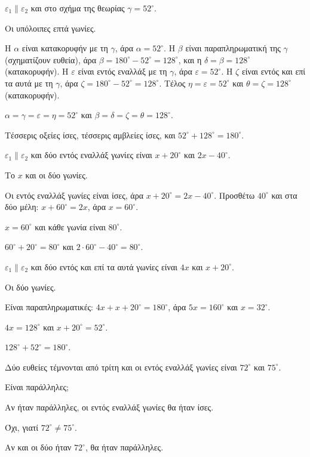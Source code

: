 \tixero $\varepsilon_1\parallel\varepsilon_2$ και στο σχήμα της θεωρίας $\gamma=52^\circ$.\par
\tithelo Οι υπόλοιπες επτά γωνίες.\par
\possindeo Η $\alpha$ είναι κατακορυφήν με τη $\gamma$, άρα $\alpha=52^\circ$. Η $\beta$ είναι παραπληρωματική της $\gamma$ (σχηματίζουν ευθεία), άρα $\beta=180^\circ-52^\circ=128^\circ$, και η $\delta=\beta=128^\circ$ (κατακορυφήν). Η $\varepsilon$ είναι εντός εναλλάξ με τη $\gamma$, άρα $\varepsilon=52^\circ$. Η $\zeta$ είναι εντός και επί τα αυτά με τη $\gamma$, άρα $\zeta=180^\circ-52^\circ=128^\circ$. Τέλος $\eta=\varepsilon=52^\circ$ και $\theta=\zeta=128^\circ$ (κατακορυφήν).\par
\apantisi $\alpha=\gamma=\varepsilon=\eta=52^\circ$ και $\beta=\delta=\zeta=\theta=128^\circ$.\par
\elegxos Τέσσερις οξείες ίσες, τέσσερις αμβλείες ίσες, και $52^\circ+128^\circ=180^\circ$.

\tixero $\varepsilon_1\parallel\varepsilon_2$ και δύο εντός εναλλάξ γωνίες είναι $x+20^\circ$ και $2x-40^\circ$.\par
\tithelo Το $x$ και οι δύο γωνίες.\par
\possindeo Οι εντός εναλλάξ γωνίες είναι ίσες, άρα $x+20^\circ=2x-40^\circ$. Προσθέτω $40^\circ$ και στα δύο μέλη: $x+60^\circ=2x$, άρα $x=60^\circ$.\par
\apantisi $x=60^\circ$ και κάθε γωνία είναι $80^\circ$.\par
\elegxos $60^\circ+20^\circ=80^\circ$ και $2\cdot60^\circ-40^\circ=80^\circ$.

\tixero $\varepsilon_1\parallel\varepsilon_2$ και δύο εντός και επί τα αυτά γωνίες είναι $4x$ και $x+20^\circ$.\par
\tithelo Οι δύο γωνίες.\par
\possindeo Είναι παραπληρωματικές: $4x+x+20^\circ=180^\circ$, άρα $5x=160^\circ$ και $x=32^\circ$.\par
\apantisi $4x=128^\circ$ και $x+20^\circ=52^\circ$.\par
\elegxos $128^\circ+52^\circ=180^\circ$.

\tixero Δύο ευθείες τέμνονται από τρίτη και οι εντός εναλλάξ γωνίες είναι $72^\circ$ και $75^\circ$.\par
\tithelo Είναι παράλληλες;\par
\possindeo Αν ήταν παράλληλες, οι εντός εναλλάξ γωνίες θα ήταν ίσες.\par
\apantisi Όχι, γιατί $72^\circ\neq75^\circ$.\par
\elegxos Αν και οι δύο ήταν $72^\circ$, θα ήταν παράλληλες.

